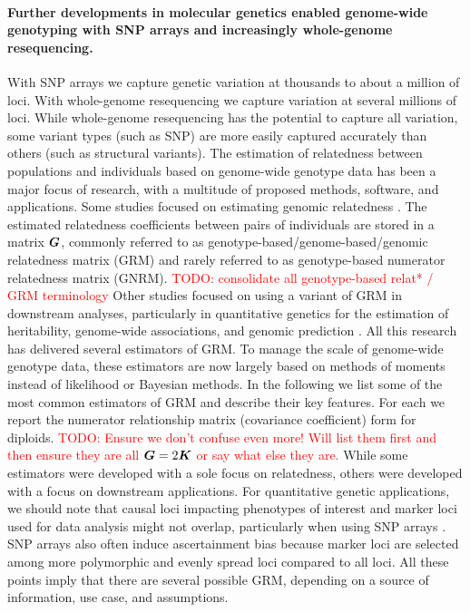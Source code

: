 \paragraph{Further developments in molecular genetics enabled genome-wide
genotyping with SNP arrays and increasingly whole-genome resequencing.}
%
With SNP arrays we capture genetic variation at thousands to
about a million of loci.
%
With whole-genome resequencing we capture variation at several millions
of loci.
%
While whole-genome resequencing has the potential to capture all variation,
some variant types (such as SNP) are more easily captured accurately than
others (such as structural variants).
%
The estimation of relatedness between populations and individuals based on
genome-wide genotype data has been a major focus of research, with
a multitude of proposed methods, software, and applications.
%
Some studies focused on estimating genomic relatedness
\citep[e.g.][]{leutenegger2003estimation, vanraden2007efficient,
manichaikul2010robust, powell2010reconciling,
toro2011note, wang2014marker, speed2015relatedness,
weir2017unified, ackerman2017estimating, weir2018how,
ochoa2021estimating, maryhuard2023fast}.
%
The estimated relatedness coefficients between pairs of individuals are
stored in a matrix $\boldsymbol{G}$, commonly referred to as
genotype-based/genome-based/genomic relatedness matrix (GRM) and
rarely referred to as genotype-based numerator relatedness matrix (GNRM).
\textcolor{red}{TODO: consolidate all genotype-based relat* / GRM terminology}
%
Other studies focused on using a variant of GRM in downstream analyses,
particularly in quantitative genetics for
the estimation of heritability,
genome-wide associations, and
genomic prediction
\citep[e.g.][]{nejatijavaremi1997effect, bernardo1999marker, meuwissen2001prediction,
visscher2006assumption, amin2007genomic, vanraden2008efficient,
yu2006unified, astle2009population, yang2010common, zaitlen2013using,
young2018relatedness, feldmann2022average}.
%
All this research has delivered several estimators of GRM.
%
To manage the scale of genome-wide genotype data, these estimators
are now largely based on methods of moments instead of likelihood or
Bayesian methods.
%
In the following we list some of the most common estimators of GRM
and describe their key features.
%
For each we report the numerator relationship matrix
(covariance coefficient) form for diploids.
\textcolor{red}{
TODO: Ensure we don't confuse even more!
      Will list them first and then ensure
      they are all $\boldsymbol{G}=2\boldsymbol{K}$ or say what else they are.}
%
While some estimators were developed with a sole focus on relatedness,
others were developed with a focus on downstream applications.
%
For quantitative genetic applications, we should note that
causal loci impacting phenotypes of interest and
marker loci used for data analysis
might not overlap, particularly when using SNP arrays
\citep{deloscampos2015genomic}.
%
SNP arrays also often induce ascertainment bias because marker loci
are selected among more polymorphic and evenly spread loci compared
to all loci.
%
All these points imply that there are several possible GRM, depending
on a source of information, use case, and assumptions.

